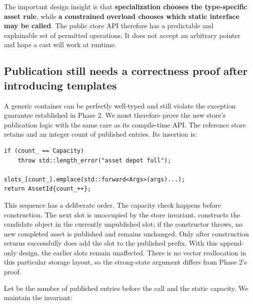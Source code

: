 The important design insight is that \textbf{specialization chooses the type-specific asset rule}, while \textbf{a constrained overload chooses which static interface may be called}. The public store API therefore has a predictable and explainable set of permitted operations. It does not accept an arbitrary pointer and hope a cast will work at runtime.

\subsection{Publication still needs a correctness proof after introducing templates}\label{01-foundations-i-ch005-publication-still-needs-a-correctness-proof-after-introducing-templates}

\hypertarget{01-foundations-i-ch005-publication-still-needs-a-correctness-proof-after-introducing-templates}{}

A generic container can be perfectly well-typed and still violate the exception guarantee established in Phase 2. We must therefore prove the new store's publication logic with the same care as its compile-time API. The reference store retains  and an integer count of published entries. Its insertion is:

\begin{verbatim}
if (count_ == Capacity)
    throw std::length_error("asset depot full");

slots_[count_].emplace(std::forward<Args>(args)...);
return AssetId{count_++};
\end{verbatim}

This sequence has a deliberate order. The capacity check happens before construction. The next slot is unoccupied by the store invariant.  constructs the candidate object in the currently unpublished slot; if the constructor throws, no new completed asset is published and  remains unchanged. Only after construction returns successfully does  add the slot to the published prefix. With this append-only design, the earlier slots remain unaffected. There is no vector reallocation in this particular storage layout, so the strong-state argument differs from Phase 2's  proof.

Let  be the number of published entries before the call and  the static capacity. We maintain the invariant:

